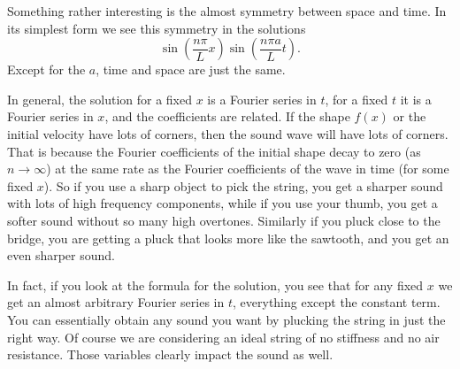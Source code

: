 \documentclass{ximera}
\begin{document}
Something rather interesting is the almost symmetry between space and time. In its simplest form we see this symmetry in the solutions
\begin{equation*}
    \sin \left( \frac{n \pi}{L} x \right) \sin \left( \frac{n \pi a}{L} t \right)  .
\end{equation*}
Except for the $a$, time and space are just the same.

In general, the solution for a fixed $x$ is a Fourier series in $t$, for a fixed $t$ it is a Fourier series in $x$, and the coefficients are related. If the shape $f(x)$ or the initial velocity have lots of corners, then the sound wave will have lots of corners.  That is because the Fourier coefficients of the initial shape decay to zero (as $n \to \infty$) at the same rate as the Fourier coefficients of the wave in time (for some fixed $x$).  So if you use a sharp object to pick the string, you get a sharper sound with lots of high frequency components, while if you use your thumb, you get a softer sound without so many high overtones.  Similarly if you pluck close to the bridge, you are getting a pluck that looks more like the sawtooth, and you get an even sharper sound.

In fact, if you look at the formula for the solution, you see that for any fixed $x$ we get an almost arbitrary Fourier series in $t$, everything except the constant term.  You can essentially obtain any sound you want by plucking the string in just the right way. Of course we are considering an ideal string of no stiffness and no air resistance.  Those variables clearly impact the sound as well.
\end{document}
